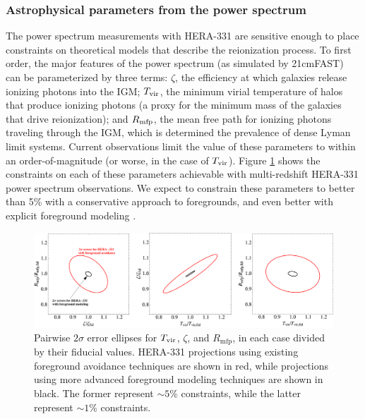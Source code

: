 \documentclass[preprint]{aastex}
\begin{document}
\subsubsection{Astrophysical parameters from the power spectrum}
The power spectrum measurements with HERA-331 are sensitive enough to place constraints on theoretical models that describe the reionization process.  To first order, the major features of the power spectrum (as simulated by 21cmFAST) can be parameterized by three terms: $\zeta$, the efficiency at which galaxies release ionizing photons into the IGM; $T_{\rm vir}$, the minimum virial temperature of halos that produce ionizing photons (a proxy for the minimum mass of the galaxies that drive reionization); and $R_{\rm mfp}$, the mean free path for ionizing photons traveling through the IGM, which is determined the prevalence of dense Lyman limit systems.  Current observations limit the value of these parameters to within an order-of-magnitude (or worse, in the case of $T_{\rm vir}$).  Figure \ref{fig:ErrorEllipses} shows the constraints on each of these parameters achievable with multi-redshift HERA-331 power spectrum observations.  We expect to constrain these parameters to better than 5\% with a conservative 
approach to foregrounds, and even better with explicit foreground modeling \citep{pober_et_al2014}.

\begin{figure}[t]\centering
\includegraphics[width=\textwidth]{plots/Pspec/OPTMIDellipses.pdf}
\caption{Pairwise $2\sigma$ error ellipses for $T_{\rm vir}$, $\zeta$, and $R_\textrm{mfp}$, in each case divided by their fiducial values.  HERA-331 projections using existing foreground avoidance techniques are shown in red, while projections using more advanced foreground modeling techniques are shown in black.  The former represent $\sim 5\%$ constraints, while the latter represent $\sim 1\%$ constraints.\label{fig:ErrorEllipses}}
\end{figure}
\end{document}
